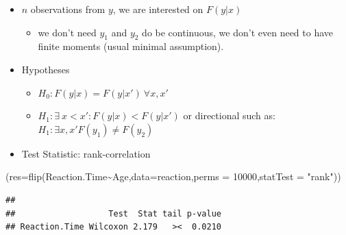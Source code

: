 \documentclass[
]{article}
\newenvironment{Shaded}{\begin{snugshade}}{\end{snugshade}}
\newcommand{\AttributeTok}[1]{\textcolor[rgb]{0.77,0.63,0.00}{#1}}
\newcommand{\CommentTok}[1]{\textcolor[rgb]{0.56,0.35,0.01}{\textit{#1}}}
\newcommand{\DecValTok}[1]{\textcolor[rgb]{0.00,0.00,0.81}{#1}}
\newcommand{\FunctionTok}[1]{\textcolor[rgb]{0.00,0.00,0.00}{#1}}
\newcommand{\NormalTok}[1]{#1}
\newcommand{\SpecialCharTok}[1]{\textcolor[rgb]{0.00,0.00,0.00}{#1}}
\newcommand{\StringTok}[1]{\textcolor[rgb]{0.31,0.60,0.02}{#1}}
\providecommand{\tightlist}{%
  \setlength{\itemsep}{0pt}\setlength{\parskip}{0pt}}
\begin{document}
\begin{itemize}
\tightlist
\item
  \(n\) observations from \(y\), we are interested on \(F(y|x)\)

  \begin{itemize}
  \tightlist
  \item
    we don't need \(y_1\) and \(y_2\) do be continuous, we don't even
    need to have finite moments (usual minimal assumption).
  \end{itemize}
\item
  Hypotheses

  \begin{itemize}
  \tightlist
  \item
    \(H_0: F(y|x)=F(y|x')\ \forall x,x'\)\\
  \item
    \(H_1: \exists \ x< x' : F(y|x)< F(y|x')\) or directional such as:
    \(H_1: \exists x,x' F(y_1)\neq F(y_2)\)
  \end{itemize}
\item
  Test Statistic: rank-correlation
\end{itemize}

\begin{Shaded}
\begin{Highlighting}[]
\NormalTok{(}\AttributeTok{res=}\FunctionTok{flip}\NormalTok{(Reaction.Time}\SpecialCharTok{\textasciitilde{}}\NormalTok{Age,}\AttributeTok{data=}\NormalTok{reaction,}\AttributeTok{perms =} \DecValTok{10000}\NormalTok{,}\AttributeTok{statTest  =} \StringTok{"rank"}\NormalTok{))}
\end{Highlighting}
\end{Shaded}

\begin{verbatim}
## 
##                   Test  Stat tail p-value
## Reaction.Time Wilcoxon 2.179   ><  0.0210
\end{verbatim}

\begin{Shaded}
\end{Shaded}
\end{document}

